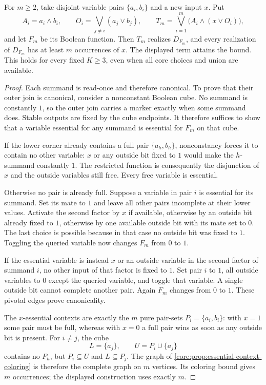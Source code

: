 \begin{theorem}
\label{core:thm:canonical-source-repetition}
For $m\geq2$, take disjoint variable pairs $\{a_i,b_i\}$ and a new
input $x$. Put
\[
 A_i=a_i\wedge b_i,\qquad
 O_i=\bigvee_{j\ne i}(a_j\vee b_j),\qquad
 T_m=\bigvee_{i=1}^m\bigl(A_i\wedge(x\vee O_i)\bigr),
\]
and let $F_m$ be its Boolean function. Then $T_m$ realizes $D_{F_m}$,
and every realization of $D_{F_m}$ has at least $m$ occurrences of $x$.
The displayed term attains the bound. This holds for every fixed
$K\geq3$, even when all core choices and union are available.
\end{theorem}
\begin{proof}
Each summand is read-once and therefore canonical. To prove that their
outer join is canonical, consider a nonconstant Boolean cube. No summand
is constantly $1$, so the outer join carries a marker exactly when some
summand does. Stable outputs are fixed by the cube endpoints. It therefore
suffices to show that a variable essential for any summand is essential
for $F_m$ on that cube.

If the lower corner already contains a full pair $\{a_h,b_h\}$,
nonconstancy forces it to contain no other variable: $x$ or any outside
bit fixed to $1$ would make the $h$-summand constantly $1$.
The restricted function is consequently the disjunction of $x$ and the
outside variables still free. Every free variable is essential.

Otherwise no pair is already full. Suppose a variable in pair $i$ is
essential for its summand. Set its mate to $1$ and leave all other
pairs incomplete at their lower values. Activate the second factor
by $x$ if available, otherwise by an outside bit already fixed to $1$,
otherwise by one available outside bit with its mate set to $0$.
The last choice is possible because in that case no outside bit was
fixed to $1$. Toggling the queried variable now changes $F_m$ from
$0$ to $1$.

If the essential variable is instead $x$ or an outside variable in the
second factor of summand $i$, no other input of that factor is fixed
to $1$. Set pair $i$ to $1$, all outside variables to $0$ except the
queried variable, and toggle that variable. A single outside bit cannot
complete another pair. Again $F_m$ changes from $0$ to $1$.
These pivotal edges prove canonicality.

The $x$-essential contexts are exactly the $m$ pure pair-sets
$P_i=\{a_i,b_i\}$: with $x=1$ some pair must be full, whereas with
$x=0$ a full pair wins as soon as any outside bit is present.
For $i\ne j$, the cube
\[
 L=\{a_j\},\qquad U=P_i\cup\{a_j\}
\]
contains no $P_h$, but $P_i\subseteq U$ and $L\subseteq P_j$.
The graph of \cref{core:prop:essential-context-coloring} is therefore
the complete graph on $m$ vertices. Its coloring bound gives $m$
occurrences; the displayed construction uses exactly $m$.
\end{proof}
